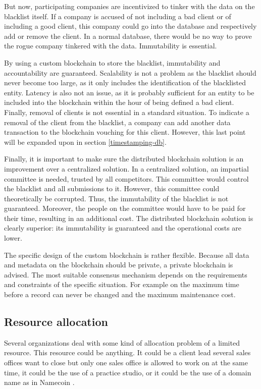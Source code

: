 But now, participating companies are incentivized to tinker with the data on the blacklist itself. If a company is accused of not including a bad client or of including a good client, this company could go into the database and respectively add or remove the client. In a normal database, there would be no way to prove the rogue company tinkered with the data. Immutability is essential.

By using a custom blockchain to store the blacklist, immutability and accountability are guaranteed. Scalability is not a problem as the blacklist should never become too large, as it only includes the identification of the blacklisted entity. Latency is also not an issue, as it is probably sufficient for an entity to be included into the blockchain within the hour of being defined a bad client. Finally, removal of clients is not essential in a standard situation. To indicate a removal of the client from the blacklist, a company can add another data transaction to the blockchain vouching for this client. However, this last point will be expanded upon in section \ref{timestamping-db}.

Finally, it is important to make sure the distributed blockchain solution is an improvement over a centralized solution. In a centralized solution, an impartial committee is needed, trusted by all competitors. This committee would control the blacklist and all submissions to it. However, this committee could theoretically be corrupted. Thus, the immutability of the blacklist is not guaranteed. Moreover, the people on the committee would have to be paid for their time, resulting in an additional cost. The distributed blockchain solution is clearly superior: its immutability is guaranteed and the operational costs are lower.

The specific design of the custom blockchain is rather flexible. Because all data and metadata on the blockchain should be private, a private blockchain is advised. The most suitable consensus mechanism depends on the requirements and constraints of the specific situation. For example on the maximum time before a record can never be changed and the maximum maintenance cost.

\subsection{Resource allocation}

Several organizations deal with some kind of allocation problem of a limited resource. This resource could be anything. It could be a client lead several sales offices want to close but only one sales office is allowed to work on at the same time, it could be the use of a practice studio, or it could be the use of a domain name as in Namecoin \cite{namecoin-whitepaper}. 

